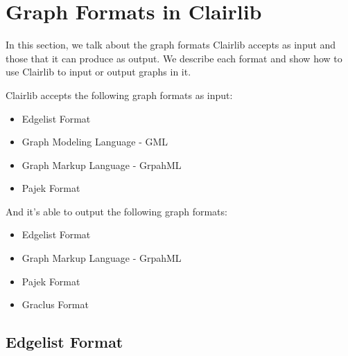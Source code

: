 \section{Graph Formats in Clairlib}

In this section, we talk about the graph formats Clairlib accepts as input and those that it can produce as output. We describe each format and show how to use Clairlib to input or output graphs in it.

Clairlib accepts the following graph formats as input:
\begin{itemize}
  \item Edgelist Format
  \item Graph Modeling Language - GML
  \item Graph Markup Language - GrpahML
  \item Pajek Format
\end{itemize}

And it's able to output the following graph formats:

\begin{itemize}
  \item Edgelist Format
  \item Graph Markup Language - GrpahML
  \item Pajek Format
  \item Graclus Format
\end{itemize}

\subsection{Edgelist Format}

